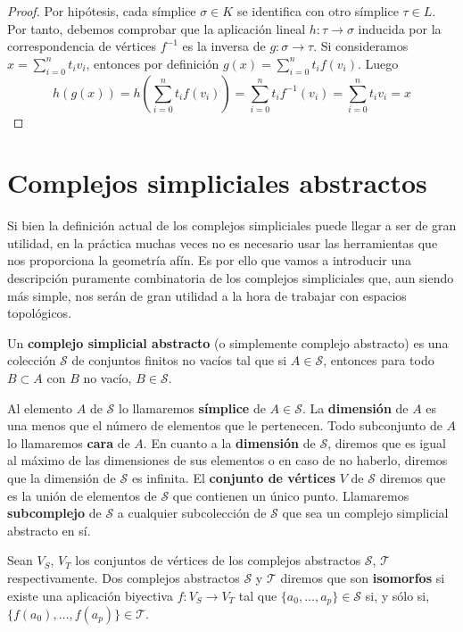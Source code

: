 \begin{proof}
	Por hipótesis, cada símplice $\sigma \in K$ se identifica con otro símplice $\tau \in L$. 
	Por tanto, debemos comprobar que la aplicación lineal $h: \tau \rightarrow \sigma$ inducida por 
	la correspondencia de vértices $f^{-1}$ es la inversa de $g: \sigma \rightarrow \tau$. Si 
	consideramos $x = \sum_{i=0}^{n}t_i v_i$, entonces por definición $g(x) = \sum_{i=0}^{n}t_if(v_i)$.
	Luego
	\[ h(g(x)) = h(\sum_{i=0}^{n}t_if(v_i)) = \sum_{i=0}^{n}t_i f^{-1}(v_i) = \sum_{i=0}^{n}t_i v_i = x \]
\end{proof}

\section{Complejos simpliciales abstractos}

Si bien la definición actual de los complejos simpliciales puede llegar a ser de gran utilidad, en 
la práctica muchas veces no es necesario usar las herramientas que nos proporciona la geometría afín. 
Es por ello que vamos a introducir una descripción puramente combinatoria de los complejos simpliciales 
que, aun siendo más simple, nos serán de gran utilidad a la hora de trabajar con espacios topológicos.

\begin{definicion}
	Un \textbf{complejo simplicial abstracto} (o simplemente complejo abstracto) es una 
	colección $\mathcal{S}$ de conjuntos finitos no vacíos tal que si $A \in \mathcal{S}$, 
	entonces para todo $B \subset A$ con $B$ no vacío, $B \in \mathcal{S}$.
\end{definicion}

Al elemento $A$ de $\mathcal{S}$ lo llamaremos \textbf{símplice} de $A \in \mathcal{S}$. La 
\textbf{dimensión} de $A$ es una menos que el número de elementos que le pertenecen. Todo 
subconjunto de $A$ lo llamaremos \textbf{cara} de $A$. En cuanto a la \textbf{dimensión} de 
$\mathcal{S}$, diremos que es igual al máximo de las dimensiones de sus elementos o en caso de 
no haberlo, diremos que la dimensión de $\mathcal{S}$ es infinita. El \textbf{conjunto de vértices} 
$V$ de $\mathcal{S}$ diremos que es la unión de elementos de $\mathcal{S}$ que contienen un único punto. 
Llamaremos \textbf{subcomplejo} de $\mathcal{S}$ a cualquier subcolección de $\mathcal{S}$ que sea 
un complejo simplicial abstracto en sí.

Sean $V_S$, $V_T$ los conjuntos de vértices de los complejos abstractos $\mathcal{S}$, $\mathcal{T}$  respectivamente. Dos complejos abstractos $\mathcal{S}$ y $\mathcal{T}$ diremos que son 
\textbf{isomorfos} si existe una aplicación biyectiva $f: V_S \rightarrow V_T$ tal que 
$\{a_0, \dots, a_p\} \in \mathcal{S}$ si, y sólo si, $\{f(a_0), \dots, f(a_p)\} \in \mathcal{T}$.

